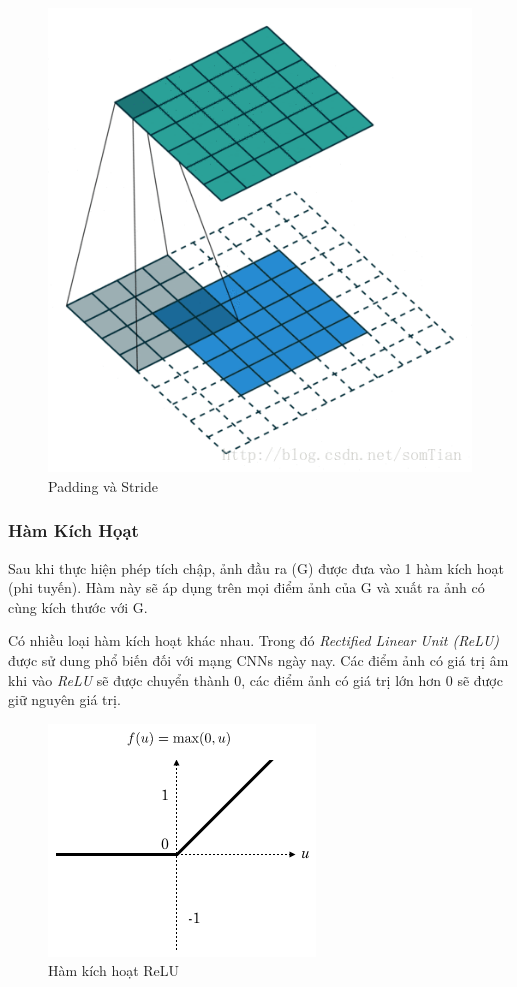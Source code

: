 \documentclass[a4paper, 12pt]{article}
\begin{document}
\begin{figure}[H]
    \begin{center} 
        \includegraphics[scale=0.5]{img/padding-stride}
        \caption{Padding và Stride}
    \end{center}
\end{figure}

\subsubsection{Hàm Kích Họạt}
Sau khi thực hiện phép tích chập, ảnh đầu ra (G) được đưa vào 1 hàm kích hoạt (phi tuyến). Hàm này sẽ áp dụng trên mọi điểm ảnh của G và xuất ra ảnh có cùng kích thước với G. 

Có nhiều loại hàm kích hoạt khác nhau. Trong đó \textit{Rectified Linear Unit (ReLU)} được sử dung phổ  biến đối với mạng CNNs ngày nay. Các điểm ảnh  có giá trị âm khi vào \textit{ReLU} sẽ được chuyển thành 0, các điểm ảnh có giá trị lớn hơn 0 sẽ được giữ nguyên giá trị. 

\begin{figure}[H]
    \begin{center} 
        \includegraphics[scale=0.8]{img/ReLU-formula}
        \caption{Hàm kích hoạt ReLU}
    \end{center}
\end{figure}
\end{document}
